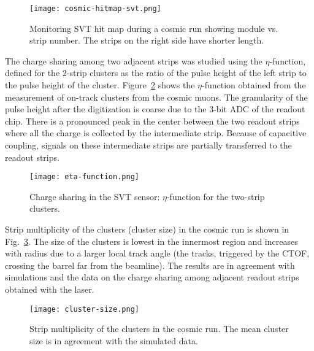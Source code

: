 \begin{figure}[hbt] 
\centering 
\texttt{[image: cosmic-hitmap-svt.png]}
\caption{Monitoring SVT hit map during a cosmic run showing module vs. strip number. The strips on the right side have shorter length.}
\label{fig:cosmic-hitmap-svt}
\end{figure}

The charge sharing among two adjacent strips was studied using the $\eta$-function, defined for the 2-strip clusters as the ratio of the pulse height of the left strip to the pulse height of the cluster. Figure~\ref{fig:eta-function} shows the  $\eta$-function obtained from the measurement of on-track clusters from the cosmic muons. The granularity of the pulse height after the digitization is coarse due to the 3-bit ADC of the readout chip. There is a pronounced peak in the center between the two readout strips where all the charge is collected by the intermediate strip. Because of capacitive coupling, signals on these intermediate strips are partially transferred to the readout strips.

\begin{figure}[hbt] 
\centering 
\texttt{[image: eta-function.png]}
\caption{Charge sharing in the SVT sensor: $\eta$-function for the two-strip clusters.}
\label{fig:eta-function}
\end{figure}

Strip multiplicity of the clusters (cluster size) in the cosmic run is shown in Fig.~\ref{fig:cluster-size}. The size of the clusters is lowest in the innermost region and increases with radius due to a larger local track angle (the tracks, triggered by the CTOF, crossing the barrel far from the beamline). The results are in agreement with simulations and the data on the charge sharing among adjacent readout strips obtained with the laser.

\begin{figure}[hbt] 
\centering 
\texttt{[image: cluster-size.png]}
\caption{Strip multiplicity of the clusters in the cosmic run. The mean cluster size is in agreement with the simulated data.}
\label{fig:cluster-size}
\end{figure}

